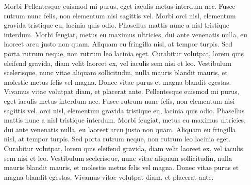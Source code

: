 \documentclass{article}
\begin{document}
 {Morbi}{} Pellentesque euismod mi purus, eget iaculis metus interdum nec.
 Fusce rutrum nunc felis, non elementum nisi sagittis vel.
 Morbi orci nisl, elementum gravida tristique eu, lacinia quis odio.
 Phasellus mattis nunc a nisl tristique interdum.
 Morbi feugiat, metus eu maximus ultricies, dui ante venenatis nulla, eu laoreet arcu justo non quam.
 Aliquam eu fringilla nisl, at tempor turpis.
 Sed porta rutrum neque, non rutrum leo lacinia eget.
 Curabitur volutpat, lorem quis eleifend gravida, diam velit laoreet ex, vel iaculis sem nisi et leo.
 Vestibulum scelerisque, nunc vitae aliquam sollicitudin, nulla mauris blandit mauris, et molestie metus felis vel magna.
 Donec vitae purus et magna blandit egestas.
 Vivamus vitae volutpat diam, et placerat ante.
Pellentesque euismod mi purus, eget iaculis metus interdum nec.
 Fusce rutrum nunc felis, non elementum nisi sagittis vel.
  orci nisl, elementum gravida tristique eu, lacinia quis odio.
 Phasellus mattis nunc a nisl tristique interdum.
 Morbi feugiat, metus eu maximus ultricies, dui ante venenatis nulla, eu laoreet arcu justo non quam.
 Aliquam eu fringilla nisl, at tempor turpis.
 Sed porta rutrum neque, non rutrum leo lacinia eget.
 Curabitur volutpat, lorem quis eleifend gravida, diam velit laoreet ex, vel iaculis sem nisi et leo.
 Vestibulum scelerisque, nunc vitae aliquam sollicitudin, nulla mauris blandit mauris, et molestie metus felis vel magna.
 Donec vitae purus et magna blandit egestas.
 Vivamus vitae volutpat diam, et placerat ante.

 


\endnumbering
\end{document}
